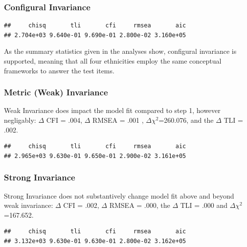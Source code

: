 \documentclass{article}\usepackage[]{graphicx}\usepackage[]{color}
\makeatletter
\newenvironment{kframe}{%
 \def\at@end@of@kframe{}%
 \ifinner\ifhmode%
  \def\at@end@of@kframe{\end{minipage}}%
  \begin{minipage}{\columnwidth}%
 \fi\fi%
 \def\FrameCommand##1{\hskip\@totalleftmargin \hskip-\fboxsep
 \colorbox{shadecolor}{##1}\hskip-\fboxsep
     \hskip-\linewidth \hskip-\@totalleftmargin \hskip\columnwidth}%
 \MakeFramed {\advance\hsize-\width
   \@totalleftmargin\z@ \linewidth\hsize
   \@setminipage}}%
 {\par\unskip\endMakeFramed%
 \at@end@of@kframe}
\newenvironment{knitrout}{}{} %
\makeatother
\begin{document}
\subsubsection{Configural Invariance}
\begin{knitrout}
\color{fgcolor}\begin{kframe}
\begin{verbatim}
##     chisq       tli       cfi     rmsea       aic 
## 2.704e+03 9.640e-01 9.690e-01 2.800e-02 3.160e+05
\end{verbatim}
\end{kframe}
\end{knitrout}

As the summary statistics given in the analyses show, configural invariance is supported, meaning that all four ethnicities employ the same conceptual frameworks to answer the test items. 
\subsubsection{Metric (Weak) Invariance}
Weak Invariance does impact the model fit compared to step 1, however negligably: $\Delta$ CFI = .004, $\Delta$ RMSEA = .001 , $\Delta$$\chi^2$=260.076, and the $\Delta$ TLI = .002.

\begin{knitrout}
\color{fgcolor}\begin{kframe}
\begin{verbatim}
##     chisq       tli       cfi     rmsea       aic 
## 2.965e+03 9.630e-01 9.650e-01 2.900e-02 3.161e+05
\end{verbatim}
\end{kframe}
\end{knitrout}


\subsubsection{Strong Invariance}
Strong Invariance does not substantively change model fit above and beyond weak invariance: $\Delta$ CFI = .002, $\Delta$ RMSEA = .000, the $\Delta$ TLI = .000 and $\Delta$$\chi^2$=167.652. 

\begin{knitrout}
\color{fgcolor}\begin{kframe}
\begin{verbatim}
##     chisq       tli       cfi     rmsea       aic 
## 3.132e+03 9.630e-01 9.630e-01 2.800e-02 3.162e+05
\end{verbatim}
\end{kframe}
\end{knitrout}
\end{document}
